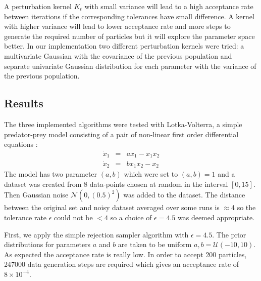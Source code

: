 \documentclass[12pt,a4paper,titlepage]{article}
\begin{document}
 A perturbation kernel $K_{t}$ with small variance will lead to a high acceptance rate between iterations if the corresponding tolerances have small difference. A kernel with higher variance will lead to lower acceptance rate and more steps to generate the required number of particles but it will explore the parameter space better\cite{filippi2011optimal}.  In our implementation two different perturbation kernels were tried: a multivariate Gaussian with the covariance of the previous population and separate univariate Gaussian distribution for each parameter with the variance of the previous population.
\subsection{Results}
The three implemented algorithms were tested with Lotka-Volterra\cite{lotka1925elements}, a simple predator-prey model consisting of a pair of non-linear first order differential equations :
\begin{eqnarray*}
\dot x_{1} & = & ax_{1} - x_{1} x_{2}\\
\dot x_{2} & =& b x_{1}x_{2} - x_{2}
\end{eqnarray*}
The model has two parameter $(a,b)$ which were set to $(a,b) = 1$ and a dataset was created from 8 data-points chosen at random in the interval $[0, 15]$. Then Gaussian noise $\mathcal{N}(0, (0.5)^2)$ was added to the dataset.  The distance between the original set and noisy dataset averaged over some runs is $\approx$4 so the tolerance rate $\epsilon$ could not be $< 4$ so a choice of $\epsilon = 4.5$ was deemed appropriate.

First, we apply the simple rejection sampler algorithm with $\epsilon = 4.5$. The prior distributions for parameters $a$ and $b$ are taken to be uniform $a, b = \mathcal{U}(-10, 10)$. As expected the acceptance rate is really low. In order to accept 200 particles, 247000 data generation steps are required which gives an acceptance rate of $8\times10^{-4}$.
\end{document}
